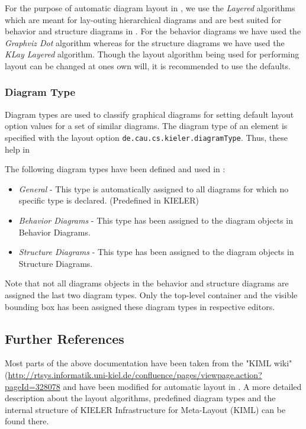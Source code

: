 For the purpose of automatic diagram layout in \eTrice{}, we use the \textit{Layered} algorithms which are 
meant for lay-outing hierarchical diagrams and are best suited for behavior and structure diagrams in 
\eTrice{}. For the behavior diagrams we have used the \textit{Graphviz Dot} algorithm whereas for the 
structure diagrams we have used the \textit{KLay Layered} algorithm. Though the layout algorithm being 
used for performing layout can be changed at ones own will, it is recommended to use the defaults.  

\subsubsection*{Diagram Type}

Diagram types are used to classify graphical diagrams for setting default layout option values for a set 
of similar diagrams. The diagram type of an element is specified with the layout option 
\texttt{de.cau.cs.kieler.diagramType}. Thus, these help in 

The following diagram types have been defined and used in \eTrice{}:
\begin{itemize}
\item \textit{General} - This type is automatically assigned to all diagrams for which no specific type is 
declared. (Predefined in KIELER)
\item \textit{\eTrice{} Behavior Diagrams} - This type has been assigned to the diagram objects in \eTrice{} 
Behavior Diagrams. 
\item \textit{\eTrice{} Structure Diagrams} - This type has been assigned to the diagram objects in \eTrice{} 
Structure Diagrams.
\end{itemize}
Note that not all diagrams objects in the behavior and structure diagrams are assigned the last two 
diagram types. Only the top-level container and the visible bounding box has been assigned these diagram 
types in respective editors.

\subsection{Further References}

Most parts of the above documentation have been taken from the "KIML wiki"
(\url{http://rtsys.informatik.uni-kiel.de/confluence/pages/viewpage.action?pageId=328078}
and have been 
modified for automatic layout in \eTrice{}. A more detailed description about the layout algorithms, 
predefined diagram types and the internal structure of KIELER Infrastructure for Meta-Layout (KIML) can be 
found there.
